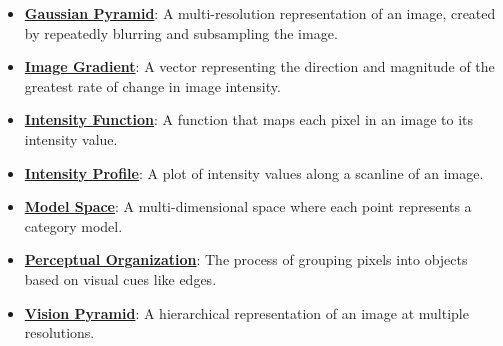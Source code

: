 \documentclass{article}%
\begin{document}
\begin{itemize}[leftmargin=*]
\item \href{https://purdue.brightspace.com/d2l/common/assets/pdfjs-d2l-dist/1.0.14-legacy/web/viewer.html?file=%2Fcontent%2Fenforced%2F1095467-wl.202510.CS.24300.001%2F08L2-Feature Extraction.pdf%3Fou%3D1095467&lang=en-us&container=d2l-fileviewer-rendered-pdf&fullscreen=d2l-fileviewer-rendered-pdf-dialog&height=667#page=31}{\textbf{Gaussian Pyramid}}: A multi-resolution representation of an image, created by repeatedly blurring and subsampling the image.%
\item \href{https://purdue.brightspace.com/d2l/common/assets/pdfjs-d2l-dist/1.0.14-legacy/web/viewer.html?file=%2Fcontent%2Fenforced%2F1095467-wl.202510.CS.24300.001%2F08L2-Feature Extraction.pdf%3Fou%3D1095467&lang=en-us&container=d2l-fileviewer-rendered-pdf&fullscreen=d2l-fileviewer-rendered-pdf-dialog&height=667#page=17}{\textbf{Image Gradient}}: A vector representing the direction and magnitude of the greatest rate of change in image intensity.%
\item \href{https://purdue.brightspace.com/d2l/common/assets/pdfjs-d2l-dist/1.0.14-legacy/web/viewer.html?file=%2Fcontent%2Fenforced%2F1095467-wl.202510.CS.24300.001%2F08L2-Feature Extraction.pdf%3Fou%3D1095467&lang=en-us&container=d2l-fileviewer-rendered-pdf&fullscreen=d2l-fileviewer-rendered-pdf-dialog&height=667#page=13}{\textbf{Intensity Function}}: A function that maps each pixel in an image to its intensity value.%
\item \href{https://purdue.brightspace.com/d2l/common/assets/pdfjs-d2l-dist/1.0.14-legacy/web/viewer.html?file=%2Fcontent%2Fenforced%2F1095467-wl.202510.CS.24300.001%2F08L2-Feature Extraction.pdf%3Fou%3D1095467&lang=en-us&container=d2l-fileviewer-rendered-pdf&fullscreen=d2l-fileviewer-rendered-pdf-dialog&height=667#page=14}{\textbf{Intensity Profile}}: A plot of intensity values along a scanline of an image.%
\item \href{https://purdue.brightspace.com/d2l/common/assets/pdfjs-d2l-dist/1.0.14-legacy/web/viewer.html?file=%2Fcontent%2Fenforced%2F1095467-wl.202510.CS.24300.001%2F08L2-Feature Extraction.pdf%3Fou%3D1095467&lang=en-us&container=d2l-fileviewer-rendered-pdf&fullscreen=d2l-fileviewer-rendered-pdf-dialog&height=667#page=3}{\textbf{Model Space}}: A multi-dimensional space where each point represents a category model.%
\item \href{https://purdue.brightspace.com/d2l/common/assets/pdfjs-d2l-dist/1.0.14-legacy/web/viewer.html?file=%2Fcontent%2Fenforced%2F1095467-wl.202510.CS.24300.001%2F08L2-Feature Extraction.pdf%3Fou%3D1095467&lang=en-us&container=d2l-fileviewer-rendered-pdf&fullscreen=d2l-fileviewer-rendered-pdf-dialog&height=667#page=7}{\textbf{Perceptual Organization}}: The process of grouping pixels into objects based on visual cues like edges.%
\item \href{https://purdue.brightspace.com/d2l/common/assets/pdfjs-d2l-dist/1.0.14-legacy/web/viewer.html?file=%2Fcontent%2Fenforced%2F1095467-wl.202510.CS.24300.001%2F08L2-Feature Extraction.pdf%3Fou%3D1095467&lang=en-us&container=d2l-fileviewer-rendered-pdf&fullscreen=d2l-fileviewer-rendered-pdf-dialog&height=667#page=30}{\textbf{Vision Pyramid}}: A hierarchical representation of an image at multiple resolutions.%
\end{itemize}%
\end{document}
